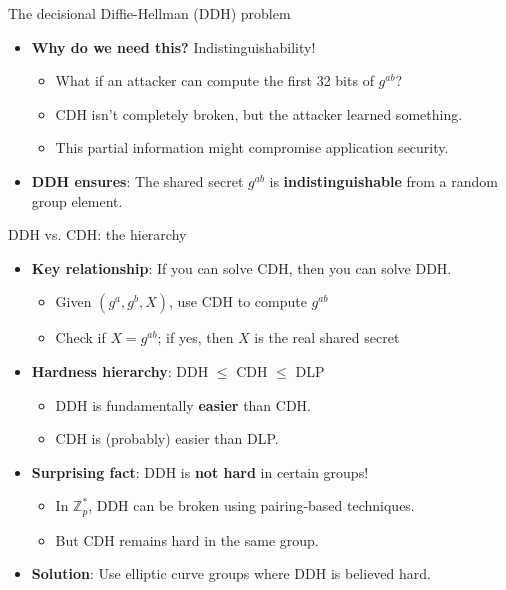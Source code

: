 \documentclass[aspectratio=169, lualatex, handout]{beamer}
\begin{document}
\begin{frame}{The decisional Diffie-Hellman (DDH) problem}
	\begin{itemize}[<+->]
		\item \textbf{Why do we need this?} Indistinguishability!
		      \begin{itemize}
			      \item What if an attacker can compute the first 32 bits of $g^{ab}$?
			      \item CDH isn't completely broken, but the attacker learned something.
			      \item This partial information might compromise application security.
		      \end{itemize}
		\item \textbf{DDH ensures}: The shared secret $g^{ab}$ is \textbf{indistinguishable} from a random group element.
	\end{itemize}
\end{frame}

\begin{frame}{DDH vs. CDH: the hierarchy}
	\begin{itemize}[<+->]
		\item \textbf{Key relationship}: If you can solve CDH, then you can solve DDH.
		      \begin{itemize}
			      \item Given $(g^a, g^b, X)$, use CDH to compute $g^{ab}$
			      \item Check if $X = g^{ab}$; if yes, then $X$ is the real shared secret
		      \end{itemize}
		\item \textbf{Hardness hierarchy}: DDH $\leq$ CDH $\leq$ DLP
		      \begin{itemize}
			      \item DDH is fundamentally \textbf{easier} than CDH.
			      \item CDH is (probably) easier than DLP.
		      \end{itemize}
		\item \textbf{Surprising fact}: DDH is \textbf{not hard} in certain groups!
		      \begin{itemize}
			      \item In $\mathbb{Z}_p^*$, DDH can be broken using pairing-based techniques.
			      \item But CDH remains hard in the same group.
		      \end{itemize}
		\item \textbf{Solution}: Use elliptic curve groups where DDH is believed hard.
	\end{itemize}
\end{frame}
\end{document}
